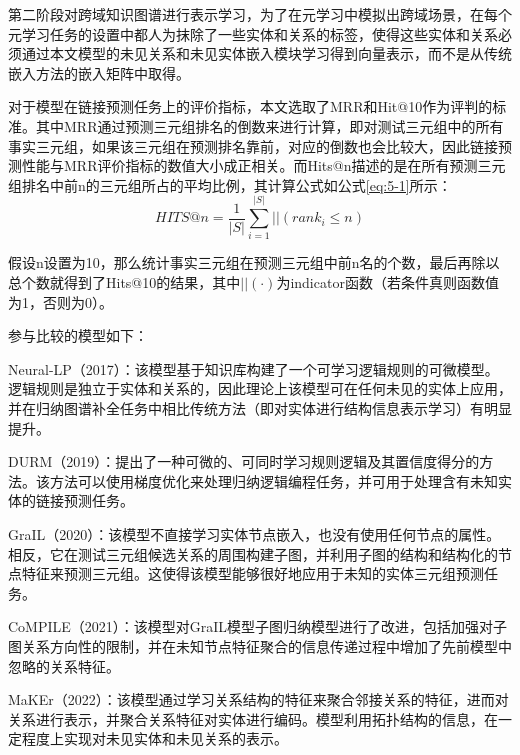 第二阶段对跨域知识图谱进行表示学习，为了在元学习中模拟出跨域场景，在每个元学习任务的设置中都人为抹除了一些实体和关系的标签，使得这些实体和关系必须通过本文模型的未见关系和未见实体嵌入模块学习得到向量表示，而不是从传统嵌入方法的嵌入矩阵中取得。

对于模型在链接预测任务上的评价指标，本文选取了MRR和Hit@10作为评判的标准。其中MRR通过预测三元组排名的倒数来进行计算，即对测试三元组中的所有事实三元组，如果该三元组在预测排名靠前，对应的倒数也会比较大，因此链接预测性能与MRR评价指标的数值大小成正相关。而Hits@n描述的是在所有预测三元组排名中前n的三元组所占的平均比例，其计算公式如公式\ref{eq:5-1}所示：
\begin{equation}
  HITS@n = \frac{1}{|S|} \sum_{i=1}^{|S|}||(rank_{i} \leqslant n) \label{eq:5-1}
\end{equation}

假设n设置为10，那么统计事实三元组在预测三元组中前n名的个数，最后再除以总个数就得到了Hits@10的结果，其中\(||(·)\)为indicator函数（若条件真则函数值为1，否则为0）。

参与比较的模型如下：

Neural-LP\cite{yang2017differentiable}（2017）：该模型基于知识库构建了一个可学习逻辑规则的可微模型。逻辑规则是独立于实体和关系的，因此理论上该模型可在任何未见的实体上应用，并在归纳图谱补全任务中相比传统方法（即对实体进行结构信息表示学习）有明显提升。

DURM\cite{sadeghian2019drum}（2019）：提出了一种可微的、可同时学习规则逻辑及其置信度得分的方法。该方法可以使用梯度优化来处理归纳逻辑编程任务，并可用于处理含有未知实体的链接预测任务。

GraIL\cite{teru2020inductive}（2020）：该模型不直接学习实体节点嵌入，也没有使用任何节点的属性。相反，它在测试三元组候选关系的周围构建子图，并利用子图的结构和结构化的节点特征来预测三元组。这使得该模型能够很好地应用于未知的实体三元组预测任务。

CoMPILE\cite{mai2021communicative}（2021）：该模型对GraIL模型子图归纳模型进行了改进，包括加强对子图关系方向性的限制，并在未知节点特征聚合的信息传递过程中增加了先前模型中忽略的关系特征。

MaKEr\cite{chen2019meta}（2022）：该模型通过学习关系结构的特征来聚合邻接关系的特征，进而对关系进行表示，并聚合关系特征对实体进行编码。模型利用拓扑结构的信息，在一定程度上实现对未见实体和未见关系的表示。

